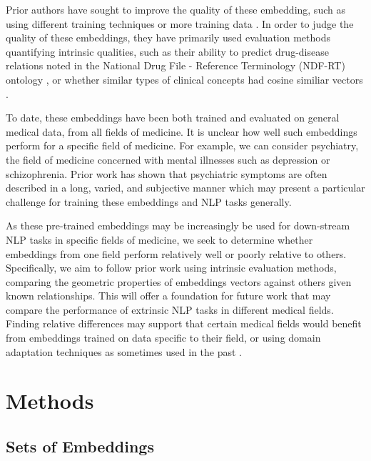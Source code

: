 \documentclass[11pt,a4paper]{article}
\begin{document}
Prior authors have sought to improve the quality of these embedding, such as using different training techniques or more training data \cite{beamClinicalConceptEmbeddings2018}. In order to judge the quality of these embeddings, they have primarily used evaluation methods quantifying intrinsic qualities, such as their ability to predict drug-disease relations noted in the National Drug File - Reference Terminology (NDF-RT) ontology \cite{minarro-gimenezExploringApplicationDeep2014}, or whether similar types of clinical concepts had cosine similiar vectors  \cite{choiLearningLowDimensionalRepresentations2016}.

To date, these embeddings have been both trained and evaluated on general medical data, from all fields of medicine. It is unclear how well such embeddings perform for a specific field of medicine. For example, we can consider psychiatry, the field of medicine concerned with mental illnesses such as depression or schizophrenia. Prior work has shown that psychiatric symptoms are often described in a long, varied, and subjective manner \cite{forbushSittingPinsNeedles2013} which may present a particular challenge for training these embeddings and NLP tasks generally.

As these pre-trained embeddings may be increasingly be used for down-stream NLP tasks in specific fields of medicine, we seek to determine whether embeddings from one field perform relatively well or poorly relative to others. Specifically, we aim to follow prior work using intrinsic evaluation methods, comparing the geometric properties of embeddings vectors against others given known relationships. This will offer a foundation for future work that may compare the performance of extrinsic NLP tasks in different medical fields. Finding relative differences may support that certain medical fields would benefit from embeddings trained on data specific to their field, or using domain adaptation techniques as sometimes used in the past \cite{yuRetrofittingConceptVector2017}. 


\section{Methods}

\subsection{Sets of Embeddings}
\end{document}
